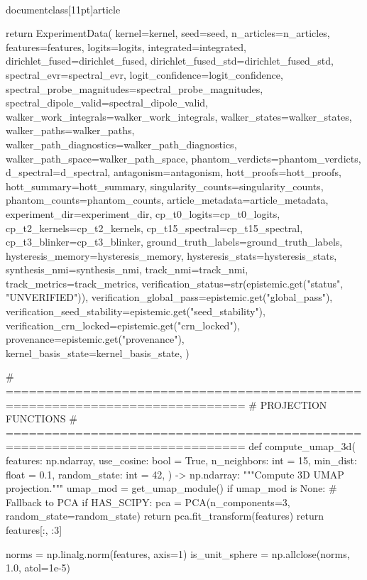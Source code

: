 \\documentclass[11pt]{article}
\begin{document}
\begin{CodeBlock}
    return ExperimentData(
        kernel=kernel,
        seed=seed,
        n_articles=n_articles,
        features=features,
        logits=logits,
        integrated=integrated,
        dirichlet_fused=dirichlet_fused,
        dirichlet_fused_std=dirichlet_fused_std,
        spectral_evr=spectral_evr,
        logit_confidence=logit_confidence,
        spectral_probe_magnitudes=spectral_probe_magnitudes,
        spectral_dipole_valid=spectral_dipole_valid,
        walker_work_integrals=walker_work_integrals,
        walker_states=walker_states,
        walker_paths=walker_paths,
        walker_path_diagnostics=walker_path_diagnostics,
        walker_path_space=walker_path_space,
        phantom_verdicts=phantom_verdicts,
        d_spectral=d_spectral,
        antagonism=antagonism,
        hott_proofs=hott_proofs,
        hott_summary=hott_summary,
        singularity_counts=singularity_counts,
        phantom_counts=phantom_counts,
        article_metadata=article_metadata,
        experiment_dir=experiment_dir,
        cp_t0_logits=cp_t0_logits,
        cp_t2_kernels=cp_t2_kernels,
        cp_t15_spectral=cp_t15_spectral,
        cp_t3_blinker=cp_t3_blinker,
        ground_truth_labels=ground_truth_labels,
        hysteresis_memory=hysteresis_memory,
        hysteresis_stats=hysteresis_stats,
        synthesis_nmi=synthesis_nmi,
        track_nmi=track_nmi,
        track_metrics=track_metrics,
        verification_status=str(epistemic.get("status", "UNVERIFIED")),
        verification_global_pass=epistemic.get("global_pass"),
        verification_seed_stability=epistemic.get("seed_stability"),
        verification_crn_locked=epistemic.get("crn_locked"),
        provenance=epistemic.get("provenance"),
        kernel_basis_state=kernel_basis_state,
    )


# =============================================================================
# PROJECTION FUNCTIONS
# =============================================================================
def compute_umap_3d(
    features: np.ndarray,
    use_cosine: bool = True,
    n_neighbors: int = 15,
    min_dist: float = 0.1,
    random_state: int = 42,
) -> np.ndarray:
    """Compute 3D UMAP projection."""
    umap_mod = get_umap_module()
    if umap_mod is None:
        # Fallback to PCA
        if HAS_SCIPY:
            pca = PCA(n_components=3, random_state=random_state)
            return pca.fit_transform(features)
        return features[:, :3]

    norms = np.linalg.norm(features, axis=1)
    is_unit_sphere = np.allclose(norms, 1.0, atol=1e-5)


\end{CodeBlock}
\end{document}

